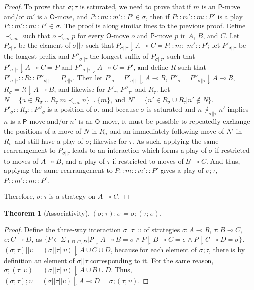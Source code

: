 \documentclass{article}
\newtheorem{theorem}{Theorem}
\newcommand{\keep}{\downharpoonright}
\begin{document}
\begin{proof}
To prove that $\sigma;\tau$ is saturated, we need to prove that if $m$ is an $\mathsf{P}$-move and/or $m'$ is a
 $\mathsf{O}$-move, and $P::m::m'::P'\in \sigma$, then if $P::m'::m::P'$ is a play $P::m'::m::P'\in \sigma$. The proof is
 along similar lines to the previous proof. Define ${\prec_{\mathit sat}}$ such that $o {\prec_{\mathit sat}} p$ for every
 $\mathsf{O}$-move $o$ and $\mathsf{P}$-move $p$ in $A$, $B$, and $C$. Let $P_{\sigma||\tau}$ be the element of
 $\sigma||\tau$ such that $P_{\sigma||\tau}\keep A\multimap C = P::m::m'::P'$; let $P'_{\sigma||\tau}$ be the longest
 prefix and $P''_{\sigma||\tau}$ the longest suffix of $P_{\sigma||\tau}$, such that $P'_{\sigma||\tau}\keep A\multimap C = P$
 and $P''_{\sigma||\tau}\keep A\multimap C = P'$, and define $R$ such that $P'_{\sigma||\tau}::R::P''_{\sigma||\tau} = P_{\sigma||\tau}$. 
Then let $P'_\sigma = P'_{\sigma||\tau}\keep A\multimap B$, $P''_\sigma = P''_{\sigma||\tau}\keep A\multimap B$,
 $R_\sigma = R\keep A\multimap B$, and likewise for $P'_\tau$, $P''_\tau$, and $R_\tau$. Let $N = \{n\in R_\sigma\cup R_\tau | m\prec_{\mathit sat}n\}\cup\{m\}$, and $N' = \{n'\in R_\sigma\cup R_\tau | n'\not\in N\}$.
 $P'_\sigma::R_\sigma::P''_\sigma$ is a position of $\sigma$, and because $\sigma$ is saturated and $n\nprec_{\sigma||\tau}n'$ implies $n$ is a $\mathsf{P}$-move and/or $n'$ is an $\mathsf{O}$-move, it must be possible to repeatedly
 exchange the positions of a move of $N$ in $R_\sigma$ and an immediately following move of $N'$ in $R_\sigma$ and still
 have a play of $\sigma$; likewise for $\tau$. As such, applying the same rearrangement to $P_{\sigma||\tau}$ leads to 
an interaction which forms a play of $\sigma$ if restricted to moves of $A\multimap B$, and a play of $\tau$ if restricted
 to moves of $B\multimap C$. And thus, applying the same rearrangement to $P::m::m'::P'$ gives a play of $\sigma;\tau$,
 $P::m'::m::P'$.

  Therefore, $\sigma;\tau$ is a strategy on $A\multimap C$.
\end{proof}

\begin{theorem}[Associativity]
  $(\sigma;\tau);\upsilon$ = $\sigma;(\tau;\upsilon)$.
\end{theorem}
\begin{proof}
  Define the three-way interaction $\sigma||\tau||\upsilon$ of
strategies $\sigma:A\multimap B$, $\tau:B\multimap C$, $\upsilon:C
\multimap D$, as $\{P\in\Sigma_{A,B,C,D}|P\keep A\multimap B=\sigma
\wedge P\keep B\multimap C=\sigma\wedge P\keep C\multimap D=\sigma\}$.
$(\sigma;\tau)||\upsilon = (\sigma||\tau||\upsilon)\keep A\cup C\cup D$,
because for each element of $\sigma;\tau$, there is by definition an
element of $\sigma||\tau$ corresponding to it. For the same reason,
$\sigma;(\tau||\upsilon) = (\sigma||\tau||\upsilon)\keep A\cup B\cup D$.
Thus, $(\sigma;\tau);\upsilon = (\sigma||\tau||\upsilon)\keep A\multimap
D = \sigma;(\tau;\upsilon)$.
\end{proof}
\end{document}
